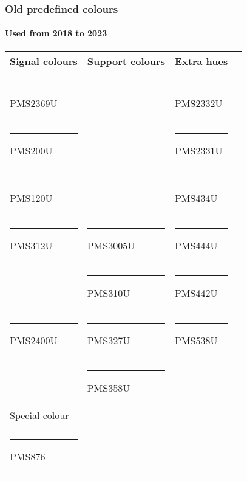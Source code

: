 \documentclass[aspectratio=169]{beamer}
\begin{document}
\begin{frame}
\frametitle{Old predefined colours}
\framesubtitle{Used from 2018 to 2023}
\centering

\begin{tabular}{llll}
  Signal colours                             & Support colours                            & Extra hues                                 \\
  \hline                                                                                                                               \\
  {\color{PMS2369U}\rule{4em}{2ex}} PMS2369U &                                            & {\color{PMS2332U}\rule{4em}{2ex}} PMS2332U \\
  {\color{PMS200U}\rule{4em}{2ex}} PMS200U   &                                            & {\color{PMS2331U}\rule{4em}{2ex}} PMS2331U \\
  {\color{PMS120U}\rule{4em}{2ex}} PMS120U   &                                            & {\color{PMS434U}\rule{4em}{2ex}} PMS434U   \\
  {\color{PMS312U}\rule{4em}{2ex}} PMS312U   & {\color{PMS3005U}\rule{4em}{2ex}} PMS3005U & {\color{PMS444U}\rule{4em}{2ex}} PMS444U   \\
                                             & {\color{PMS310U}\rule{4em}{2ex}} PMS310U   & {\color{PMS442U}\rule{4em}{2ex}} PMS442U   \\
  {\color{PMS2400U}\rule{4em}{2ex}} PMS2400U & {\color{PMS327U}\rule{4em}{2ex}} PMS327U   & {\color{PMS538U}\rule{4em}{2ex}} PMS538U   \\
                                             & {\color{PMS358U}\rule{4em}{2ex}} PMS358U   &                                            \\
  Special colour                             &                                            &                                            \\
  \hline                                                                                                                               \\
  {\color{PMS876}\rule{4em}{2ex}} PMS876     &                                            &
\end{tabular}

\end{frame}
\end{document}
